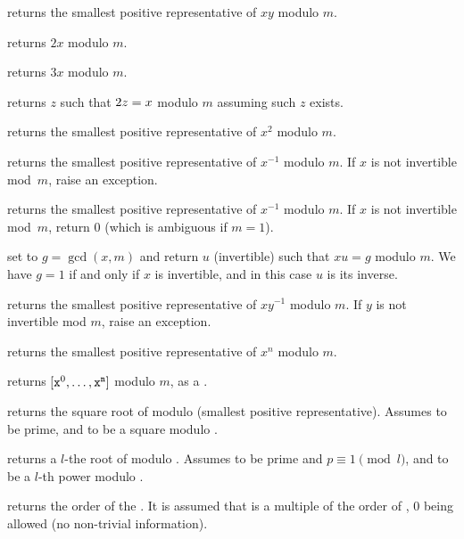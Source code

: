  returns the smallest positive
representative of $x y$ modulo $m$.

 returns $2x$ modulo $m$.

 returns $3x$ modulo $m$.

 returns $z$ such that $2\*z = x$ modulo
$m$ assuming such $z$ exists.

 returns the smallest positive
representative of $x^2$ modulo $m$.

 returns the smallest
positive representative of $x^{-1}$ modulo $m$. If $x$ is not invertible
mod~$m$, raise an exception.

 returns the smallest
positive representative of $x^{-1}$ modulo $m$. If $x$ is not invertible
mod~$m$, return $0$ (which is ambiguous if $m=1$).

 set  to
$g = \gcd(x,m)$ and return $u$ (invertible) such that $x u = g$ modulo $m$.
We have $g = 1$ if and only if $x$ is invertible, and in this case $u$
is its inverse.

 returns the smallest
positive representative of $x y^{-1}$ modulo $m$. If $y$ is not invertible
mod $m$, raise an exception.

 returns the smallest
positive representative of $x^n$ modulo $m$.

 returns
$[{\tt x}^0, \dots, {\tt x}^{\tt n}]$ modulo $m$, as a .

 returns the square root of 
modulo  (smallest positive representative). Assumes  to be
prime, and  to be a square modulo .

 returns a $l$-the root of 
modulo . Assumes  to be prime and $p \equiv 1 \pmod{l}$, and
 to be a $l$-th power modulo .

 returns the order of the
 . It is assumed that  is a multiple of the order of
, $0$ being allowed (no non-trivial information).


